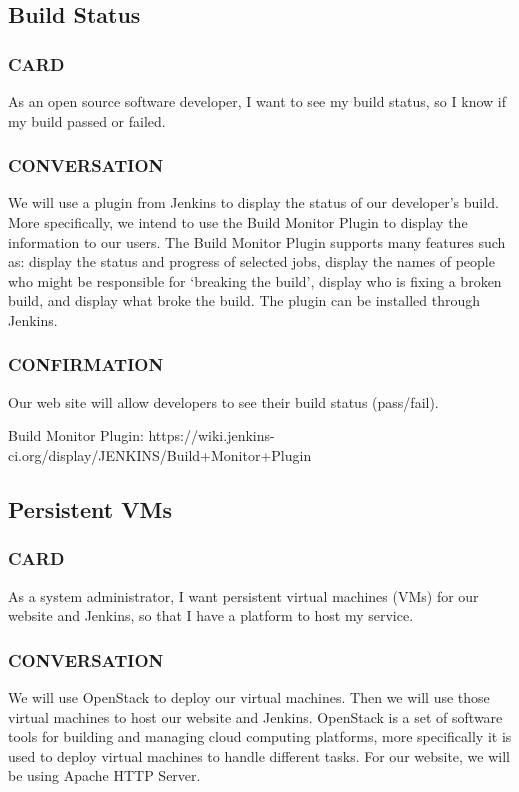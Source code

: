 \documentclass[10pt,letterpaper,onecolumn,journal]{IEEEtran}
\begin{document}
\subsection{Build Status}
\subsubsection{CARD}
As an open source software developer, I want to see my build status, so I know if my build passed or failed.
\subsubsection{CONVERSATION}
We will use a plugin from Jenkins to display the status of our developer's build. More specifically, we intend to use the Build Monitor Plugin to display the information to our users. The Build Monitor Plugin supports many features such as: display the status and progress of selected jobs, display the names of people who might be responsible for `breaking the build', display who is fixing a broken build, and display what broke the build. The plugin can be installed through Jenkins.
\subsubsection{CONFIRMATION}
Our web site will allow developers to see their build status (pass/fail).

Build Monitor Plugin: https://wiki.jenkins-ci.org/display/JENKINS/Build+Monitor+Plugin

\subsection{Persistent VMs}
\subsubsection{CARD}
As a system administrator, I want persistent virtual machines (VMs) for our website and Jenkins, so that I have a platform to host my service.
\subsubsection{CONVERSATION}
We will use OpenStack to deploy our virtual machines. Then we will use those virtual machines to host our website and Jenkins. OpenStack is a set of software tools for building and managing cloud computing platforms, more specifically it is used to deploy virtual machines to handle different tasks. For our website, we will be using Apache HTTP Server.
\end{document}
